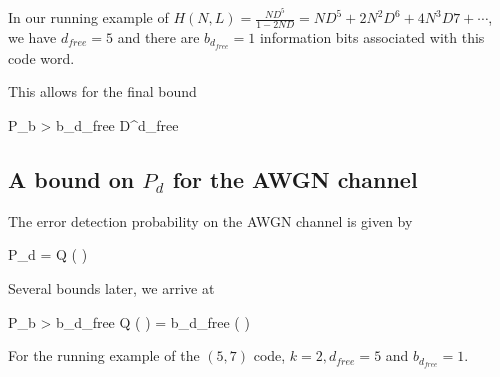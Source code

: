 In our running example of $H(N,L) = \frac{ND^5}{1-2ND} = ND^5 + 2N^2D^6 + 4N^3D7 + \cdots$, we have $d_{free} = 5$ and there are $b_{d_{free}} = 1$ information bits associated with this code word.

This allows for the final bound

\bee
P_b >  b_{d_{free}} D^{d_{free}}
\eee



\subsection{A bound on $P_d$ for the AWGN channel}

The error detection probability on the AWGN channel is given by

\bee
P_d = Q \left(  \right)
\eee

Several bounds later, we arrive at

\bee
P_b >  b_{d_{free}} Q \left(  \right) =  b_{d_{free}} \erf \left(  \right)
\eee

For the running example of the $(5,7)$ code, $k=2, d_{free} = 5$ and $b_{d_{free}} = 1$.



